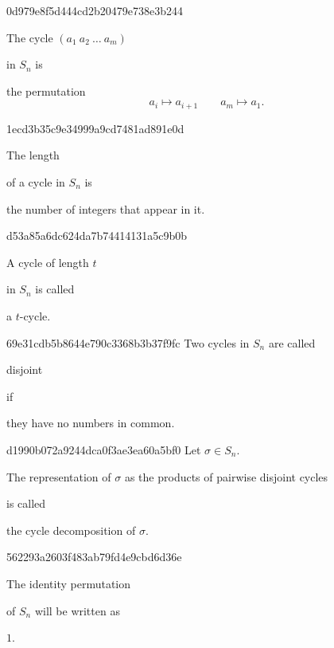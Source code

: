 \begin{note}{0d979e8f5d444cd2b20479e738e3b244}
    \begin{icloze}{2}The cycle \({ (a_1\: a_2\: \ldots\: a_m) }\)\end{icloze} in \({ S_n }\) is
    \begin{icloze}{1}
        the permutation
        \[
            a_i \mapsto a_{i+1} \qquad a_m \mapsto a_1.
        \]
    \end{icloze}
\end{note}

\begin{note}{1ecd3b35c9e34999a9cd7481ad891e0d}
    \begin{icloze}{2}The length\end{icloze} of a cycle in \({ S_n }\) is \begin{icloze}{1}the number of integers that appear in it.\end{icloze}
\end{note}

\begin{note}{d53a85a6dc624da7b74414131a5c9b0b}
    \begin{icloze}{2}A cycle of length \({ t }\)\end{icloze} in \({ S_n }\) is called \begin{icloze}{1}a \({ t }\)-cycle.\end{icloze}
\end{note}

\begin{note}{69e31cdb5b8644e790c3368b3b37f9fc}
    Two cycles in \({ S_n }\) are called \begin{icloze}{2}disjoint\end{icloze} if \begin{icloze}{1}they have no numbers in common.\end{icloze}
\end{note}

\begin{note}{d1990b072a9244dca0f3ae3ea60a5bf0}
    Let \({ \sigma \in S_n }\). \begin{icloze}{1}The representation of \({ \sigma }\) as the products of pairwise disjoint cycles\end{icloze} is called \begin{icloze}{2}the cycle decomposition of \({ \sigma }\).\end{icloze}
\end{note}

\begin{note}{562293a2603f483ab79fd4e9cbd6d36e}
    \begin{icloze}{2}The identity permutation\end{icloze} of \({ S_n }\) will be written as \begin{icloze}{1}\({ 1 }\).\end{icloze}
\end{note}


